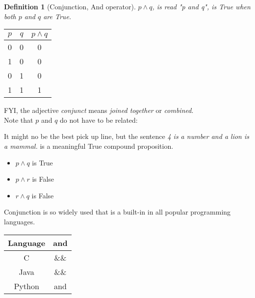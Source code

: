 \documentclass[10pt,a4paper,draft,titlepage,onecolumn]{book}
\newtheorem{definition}{Definition}[section]
\begin{document}
\begin{definition}[Conjunction, And operator] $p \wedge q$, is read "p and q", is True when both $p$ and $q$ are True.
\end{definition} 
\begin{center}
\begin{tabular}{ |c|c|c| }
 \hline
 $p$ & $q$ &  $p \wedge q$  \\
 \hline
 0 & 0 & 0 \\
 1 & 0 & 0 \\
 0 & 1 & 0 \\
 1 & 1 & 1 \\
 \hline
\end{tabular}
\end{center}
FYI, the adjective \textit{conjunct} means \textit{joined together} or \textit{combined}.\\
Note that $p$ and $q$ do not have to be related:

It might no be the best pick up line, but the sentence \textit{4 is a number and a lion is a mammal.} is a meaningful True compound proposition. \\
\begin{itemize}
\item $p \wedge q$ is True 
\item $p \wedge r$ is False
\item $r \wedge q$ is False
\end{itemize}
Conjunction is so widely used that is a built-in   in all popular programming languages.\\
\begin{tabular}{ |c|c| }
\hline
Language & and \\
\hline
 C      &  \&\& \\
 Java   & \&\& \\
 Python & and    \\
 \hline
\end{tabular}
\end{document}
